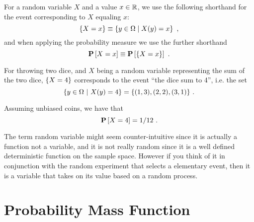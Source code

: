 \begin{flex}

\begin{gram}[Notation]
For a random variable $X$ and a value $x \in \mathbb{R}$, we use the following
shorthand for the event corresponding to $X$ equaling $x$:
\[\{X =x\} \equiv \left\{ y \in \Omega \;|\; X(y)  = x \right\}~,\]
and when applying the probability measure we use the further
shorthand
\[\mathbf{P}\left[{X = x}\right] \equiv \mathbf{P}\left[{\{X =x\}}\right]~.\]
\end{gram}

\begin{example}
  For throwing two dice, and $X$ being a random variable representing
  the sum of the two dice, $\{X =4\}$ corresponds to the
  event ``the dice sum to 4'', i.e. the set
  \[\{y \in \Omega~|~X(y) = 4\} = \{(1,3),(2,2),(3,1)\}~.\]

  Assuming unbiased coins, we have that
  \[\mathbf{P}\left[{X = 4}\right] = 1/12~.\]
\end{example}
\end{flex}

\begin{remark}
The term random variable might seem counter-intuitive
since it is actually a function not a variable, and it is not really
random since it is a well defined deterministic function on the
sample space.  However if you think of it in conjunction with the
random experiment that selects a elementary event, then it is a
variable that takes on its value based on a random process.
\end{remark}

\section{Probability Mass Function}
\label{sec:probability::randvar::pmf}

